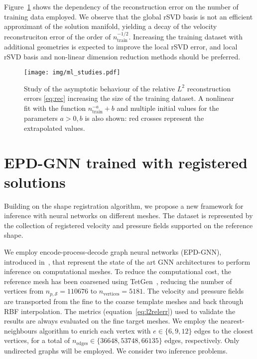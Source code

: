 Figure~\ref{fig:recerr_ntrain} shows the dependency of the reconstruction error on the number of training data employed. We observe that the global rSVD basis 
is not an efficient approximant of the solution manifold, yielding a decay of the velocity reconstruciton error of the order of $n_{\text{train}}^{-1/2}$. 
Increasing the training dataset with additional geometries is expected to improve the local rSVD error, and local rSVD basis and non-linear dimension reduction methods should be preferred. 

\begin{figure}[!htp]
  \centering
  \texttt{[image: img/ml\_studies.pdf]}
  \caption{Study of the asymptotic behaviour of the relative $L^2$ reconstruction errors \eqref{eq:rec} increasing the size of the training dataset.
  A nonlinear fit with the function $n_{\text{train}}^{-a}+b$ and multiple initial values for the parameters $a>0,b$ is also shown: red crosses represent the extrapolated values. 
}
  \label{fig:recerr_ntrain}
\end{figure}


\section{EPD-GNN trained with registered solutions}\label{ssec:pres-gnn}
Building on the shape registration algorithm, we propose a new framework for inference with neural networks on different meshes. 
The dataset is represented by the collection of registered velocity and pressure fields supported on the reference shape.

We employ encode-process-decode graph neural networks (EPD-GNN), introduced in~\cite{pfaff2020learning}, that 
represent the state of the art GNN architectures to perform inference on computational meshes. 
To reduce the computational cost, the reference mesh has been coarsened using TetGen~\cite{Si2015}, reducing the number of vertices from $n_{p, \mathcal{S}}=110676$ to $n_{\text{vertices}}=5181$.
%
The velocity and pressure fields are transported from the fine to the coarse template meshes and back through RBF interpolation. The metrics (equation~\eqref{eq:l2relerr}) used to validate the results are always evaluated on the fine target meshes. We employ the nearest-neighbours algorithm to enrich each vertex with $e\in\{6, 9, 12\}$ edges to the closest vertices, for a total of $n_{\text{edges}}\in\{36648, 53748, 66135\}$ edges, respectively. Only undirected graphs will be employed.
%
We consider two inference problems.
